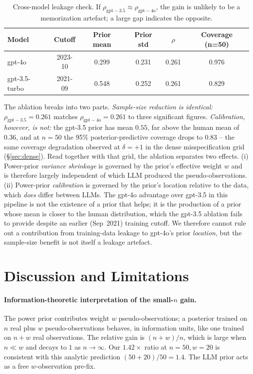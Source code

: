 \documentclass[11pt]{article}
\begin{document}
\begin{table}[h]
  \centering
  \small
  \begin{tabular}{lccccc}
    \toprule
    Model & Cutoff & Prior mean & Prior std & $\rho$ & Coverage (n=50) \\
    \midrule
    gpt-4o & 2023-10 & 0.299 & 0.231 & 0.261 & 0.976 \\
    gpt-3.5-turbo & 2021-09 & 0.548 & 0.252 & 0.261 & 0.829 \\
    \bottomrule
  \end{tabular}
  \caption{Cross-model leakage check. If $\rho_{\mathrm{gpt-3.5}} \approx \rho_{\mathrm{gpt-4o}}$,
  the gain is unlikely to be a memorization artefact; a large gap indicates the opposite.}
  \label{tab:leakage}
\end{table}

\noindent
The ablation breaks into two parts. \emph{Sample-size reduction is identical:}
$\rho_{\mathrm{gpt-3.5}} = 0.261$ matches $\rho_{\mathrm{gpt-4o}} = 0.261$ to three
significant figures. \emph{Calibration, however, is not:} the gpt-3.5 prior has mean
$0.55$, far above the human mean of $0.36$, and at $n=50$ the 95\% posterior-predictive
coverage drops to $0.83$ -- the same coverage degradation observed at $\delta = +1$ in
the dense misspecification grid (\S\ref{sec:dense}). Read together with that grid, the
ablation separates two effects. (i) Power-prior \emph{variance shrinkage} is
governed by the prior's effective weight $w$ and is therefore largely independent of
which LLM produced the pseudo-observations. (ii) Power-prior \emph{calibration} is
governed by the prior's location relative to the data, which \emph{does} differ between
LLMs. The gpt-4o advantage over gpt-3.5 in this pipeline is not the existence of a prior
that helps; it is the production of a prior whose mean is closer to the human distribution,
which the gpt-3.5 ablation fails to provide despite an earlier (Sep~2021) training
cutoff. We therefore cannot rule out a contribution from training-data leakage to gpt-4o's
prior \emph{location}, but the sample-size benefit is not itself a leakage artefact.

\section{Discussion and Limitations}
\label{sec:discussion}

\paragraph{Information-theoretic interpretation of the small-$n$ gain.}
The power prior contributes weight $w$ pseudo-observations; a posterior trained on $n$ real
plus $w$ pseudo-observations behaves, in information units, like one trained on $n+w$ real
observations. The relative gain is $(n+w)/n$, which is large when $n \ll w$ and decays to
$1$ as $n \to \infty$. Our $1.42\times$ ratio at $n=50, w=20$ is consistent with this analytic
prediction $(50+20)/50 = 1.4$. The LLM prior acts as a free $w$-observation pre-fix.
\end{document}
